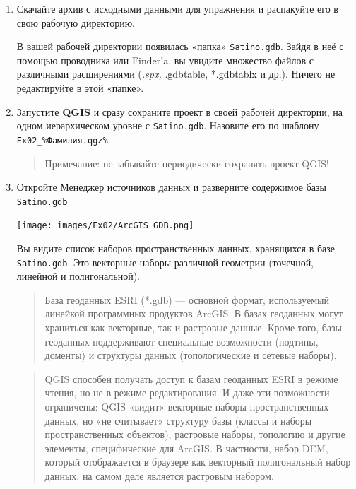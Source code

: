 \documentclass[
  12pt,
]{book}
\begin{document}
\begin{enumerate}
\def\labelenumi{\arabic{enumi}.}
\item
  Скачайте архив с исходными данными для упражнения и распакуйте его в свою рабочую директорию.

  В вашей рабочей директории появилась «папка» \texttt{Satino.gdb}. Зайдя в неё с помощью проводника или Finder'a, вы увидите множество файлов с различными расширениями (\emph{.spx, }.gdbtable, *.gdbtablx и др.). Ничего не редактируйте в этой «папке».
\item
  Запустите \textbf{QGIS} и сразу сохраните проект в своей рабочей директории, на одном иерархическом уровне с \texttt{Satino.gdb}. Назовите его по шаблону \texttt{Ex02\_\%Фамилия.qgz\%}.

  \begin{quote}
  Примечание: не забывайте периодически сохранять проект QGIS!
  \end{quote}
\item
  Откройте Менеджер источников данных и разверните содержимое базы \texttt{Satino.gdb}

  \texttt{[image: images/Ex02/ArcGIS\_GDB.png]}

  Вы видите список наборов пространственных данных, хранящихся в базе \texttt{Satino.gdb}. Это векторные наборы различной геометрии (точечной, линейной и полигональной).

  \begin{quote}
  База геоданных ESRI (*.gdb) --- основной формат, используемый линейкой программных продуктов ArcGIS. В базах геоданных могут храниться как векторные, так и растровые данные. Кроме того, базы геоданных поддерживают специальные возможности (подтипы, доменты) и структуры данных (топологические и сетевые наборы).
  \end{quote}

  \begin{quote}
  QGIS способен получать доступ к базам геоданных ESRI в режиме чтения, но не в режиме редактирования. И даже эти возможности ограничены: QGIS «видит» векторные наборы пространственных данных, но «не считывает» структуру базы (классы и наборы пространственных объектов), растровые наборы, топологию и другие элементы, специфические для ArcGIS. В частности, набор DEM, который отображается в браузере как векторный полигональный набор данных, на самом деле является растровым набором.
  \end{quote}
\end{enumerate}
\end{document}
